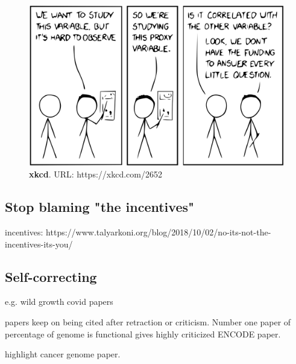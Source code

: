 
\begin{figure}[H]
    \includegraphics[width=\linewidth]{ch.discussion/imgs/xkcd.png}
    \caption{\textbf{xkcd}. URL: https://xkcd.com/2652}
    \label{fig:xkcd}
\end{figure}

\subsection{Stop blaming "the incentives"}

incentives: https://www.talyarkoni.org/blog/2018/10/02/no-its-not-the-incentives-its-you/

\subsection{Self-correcting}

e.g. wild growth covid papers

papers keep on being cited after retraction or criticism. Number one paper of percentage of genome is functional gives highly criticized ENCODE paper.

highlight cancer genome paper.



